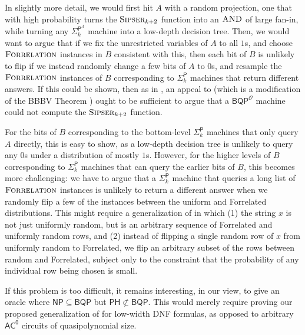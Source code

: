 \documentclass[11pt]{article}%
\newcommand{\Sipser}{\normalfont\textsc{Sipser}}
\newcommand{\AND}{\normalfont\textsc{AND}} %
\newcommand{\Forrelation}{\normalfont\textsc{Forrelation}}
\begin{document}
In slightly more detail, we would first hit $A$ with a random projection, one that with high probability turns the $\Sipser_{k+2}$ function into an $\AND$ of large fan-in, while turning any $\mathsf{\Sigma}_{k}^{\mathsf{P}^A}$ machine into a low-depth decision tree. Then, we would want to argue that if we fix the unrestricted variables of $A$ to all $1$s, and choose $\Forrelation$ instances in $B$ consistent with this, then each bit of $B$ is unlikely to flip if we instead randomly change a few bits of $A$ to $0$s, and resample the $\Forrelation$ instances of $B$ corresponding to $\mathsf{\Sigma}_{k}^{\mathsf{P}}$ machines that return different answers. If this could be shown, then as in , an appeal to  (which is a modification of the BBBV Theorem \cite{BBBV97}) ought to be sufficient to argue that a $\mathsf{BQP}^\mathcal{O}$ machine could not compute the $\Sipser_{k+2}$ function.

For the bits of $B$ corresponding to the bottom-level $\mathsf{\Sigma}_{k}^{\mathsf{P}}$ machines that only query $A$ directly, this is easy to show, as a low-depth decision tree is unlikely to query any $0$s under a distribution of mostly $1$s. However, for the higher levels of $B$ corresponding to $\mathsf{\Sigma}_{k}^{\mathsf{P}}$ machines that can query the earlier bits of $B$, this becomes more challenging: we have to argue that a $\mathsf{\Sigma}_{k}^{\mathsf{P}}$ machine that queries a long list of $\Forrelation$ instances is unlikely to return a different answer when we randomly flip a few of the instances between the uniform and Forrelated distributions. This might require a generalization of  in which (1) the string $x$ is not just uniformly random, but is an arbitrary sequence of Forrelated and uniformly random rows, and (2) instead of flipping a single random row of $x$ from uniformly random to Forrelated, we flip an arbitrary subset of the rows between random and Forrelated, subject only to the constraint that the probability of any individual row being chosen is small.

If this problem is too difficult, it remains interesting, in our view, to give an oracle where $\mathsf{NP} \subseteq \mathsf{BQP}$ but $\mathsf{PH} \not\subset \mathsf{BQP}$. This would merely require proving our proposed generalization of  for low-width DNF formulas, as opposed to arbitrary $\mathsf{AC^0}$ circuits of quasipolynomial size.
\end{document}
